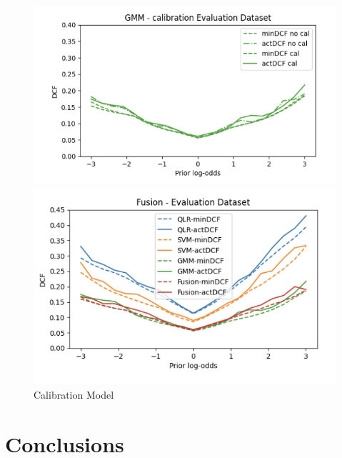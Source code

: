 \documentclass{article}
\begin{document}
\begin{figure}[H]
    \begin{minipage}{.4\textwidth}
        \centering
        \includegraphics[width=\linewidth]{./img/EVAL3.png}
    \end{minipage}
    \begin{minipage}{.4\textwidth}
        \centering
        \includegraphics[width=\linewidth]{./img/EVAL4.png}
    \end{minipage}
    \caption{Calibration Model} %
    \label{fig:CalEVAL} %
\end{figure}
\section{Conclusions}


\newpage



\end{document}
